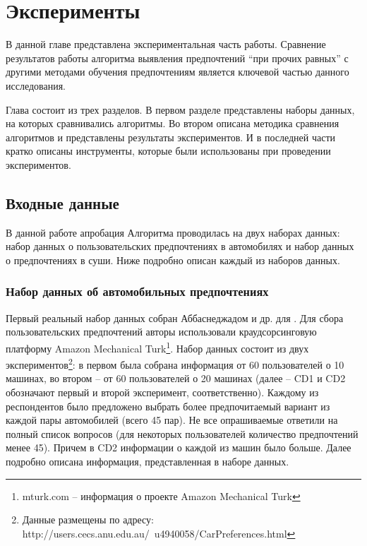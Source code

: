 \chapter{Эксперименты}
\label{chapter:experiments}
В данной главе представлена экспериментальная часть работы. Сравнение результатов работы алгоритма выявления предпочтений \enquote{при прочих равных} с другими методами обучения предпочтениям является ключевой частью данного исследования.

Глава состоит из трех разделов. В первом разделе представлены наборы данных, на которых сравнивались алгоритмы. Во втором описана методика сравнения алгоритмов и представлены результаты экспериментов. И в последней части кратко описаны инструменты, которые были использованы при проведении экспериментов.

\section{Входные данные}
	В данной работе
	апробация Алгоритма проводилась на двух наборах данных: набор данных о пользовательских предпочтениях в автомобилях и набор данных о предпочтениях в суши. Ниже подробно описан каждый из наборов данных.
	
	
	\subsection{Набор данных об автомобильных предпочтениях}
	\label{subsec:cars_description}
		Первый реальный набор данных собран Аббаснеджадом и др. для \cite{dataset:Abbasnejad:2013}. Для сбора пользовательских предпочтений авторы использовали краудсорсинговую платформу Amazon Mechanical Turk\footnote{mturk.com – информация о проекте Amazon Mechanical Turk}. Набор данных состоит из двух экспериментов\footnote{Данные размещены по адресу: http://users.cecs.anu.edu.au/~u4940058/CarPreferences.html}: в первом была собрана информация от 60 пользователей о 10 машинах, во втором – от 60 пользователей о 20 машинах (далее – CD1 и CD2 обозначают первый и второй эксперимент, соответственно). Каждому из респондентов было предложено выбрать более предпочитаемый вариант из каждой пары автомобилей (всего 45 пар). Не все опрашиваемые ответили на полный список вопросов (для некоторых пользователей количество предпочтений менее 45). Причем в CD2 информации о каждой из машин было больше. Далее подробно описана информация, представленная в наборе данных.
		
